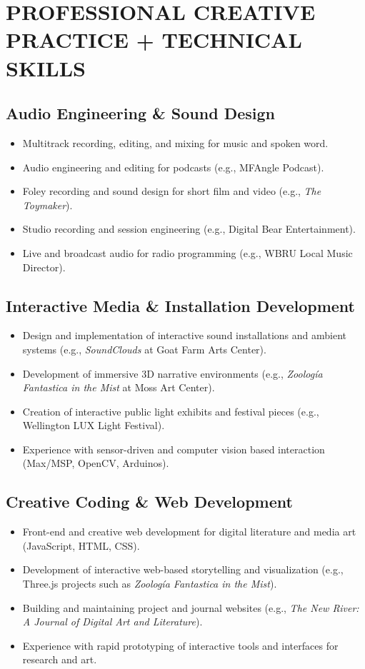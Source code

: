 \section{PROFESSIONAL CREATIVE PRACTICE + TECHNICAL SKILLS}

\subsection{Audio Engineering \& Sound Design}
\begin{itemize}
  \item Multitrack recording, editing, and mixing for music and spoken word.
  \item Audio engineering and editing for podcasts (e.g., MFAngle Podcast).
  \item Foley recording and sound design for short film and video (e.g., \emph{The Toymaker}).
  \item Studio recording and session engineering (e.g., Digital Bear Entertainment).
  \item Live and broadcast audio for radio programming (e.g., WBRU Local Music Director).
\end{itemize}

\subsection{Interactive Media \& Installation Development}
\begin{itemize}
  \item Design and implementation of interactive sound installations and ambient systems (e.g., \emph{SoundClouds} at Goat Farm Arts Center).
  \item Development of immersive 3D narrative environments (e.g., \emph{Zoolog\'ia Fantastica in the Mist} at Moss Art Center).
  \item Creation of interactive public light exhibits and festival pieces (e.g., Wellington LUX Light Festival).
  \item Experience with sensor-driven and computer vision based interaction (Max/MSP, OpenCV, Arduinos).
\end{itemize}

\subsection{Creative Coding \& Web Development}
\begin{itemize}
  \item Front-end and creative web development for digital literature and media art (JavaScript, HTML, CSS).
  \item Development of interactive web-based storytelling and visualization (e.g., Three.js projects such as \emph{Zoolog\'ia Fantastica in the Mist}).
  \item Building and maintaining project and journal websites (e.g., \emph{The New River: A Journal of Digital Art and Literature}).
  \item Experience with rapid prototyping of interactive tools and interfaces for research and art.
\end{itemize}

